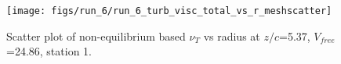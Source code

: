 \begin{figure}[H]
\centering
\texttt{[image: figs/run\_6/run\_6\_turb\_visc\_total\_vs\_r\_meshscatter]}
\caption{Scatter plot of non-equilibrium based $\nu_T$ vs radius at $z/c$=5.37, $V_{free}$=24.86, station 1.}
\label{fig:run_6_turb_visc_total_vs_r_meshscatter}
\end{figure}


